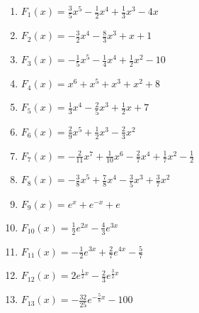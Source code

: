 \documentclass[a4paper,12pt, headsepline, ngerman]{scrartcl}
\theoremstyle{definition}
\begin{document}
\begin{Answer}[ref=stammfunktionenA1]
	\begin{enumerate}[label=\alph*)]
		\item \(F_1(x)=\frac{3}{5}x^5-\frac{1}{2}x^4+\frac{1}{3}x^3-4x\)
		\item \(F_2(x)=-\frac{3}{2}x^4-\frac{8}{3}x^3+x+1\)
		\item \(F_3(x)=-\frac{1}{5}x^5-\frac{1}{4}x^4+\frac{1}{2}x^2-10\)
		\item \(F_4(x)=x^6+x^5+x^3+x^2+8\)
		\item \(F_5(x)=\frac{1}{3}x^4-\frac{2}{5}x^3+\frac{1}{2}x+7\)
		\item \(F_6(x)=\frac{2}{9}x^5+\frac{1}{2}x^3-\frac{2}{3}x^2\)
		\item \(F_7(x)=-\frac{2}{11}x^7+\frac{1}{10}x^6-\frac{2}{7}x^4+\frac{1}{7}x^2-\frac{1}{2}\)
		\item \(F_8(x)=-\frac{3}{8}x^5+\frac{7}{8}x^4-\frac{3}{5}x^3+\frac{3}{7}x^2\)
		\item \(F_9(x)=e^x+e^{-x}+e\)
		\item \(F_{10}(x)=\frac{1}{2}e^{2x}-\frac{4}{3}e^{3x}\)
		\item \(F_{11}(x)=-\frac{1}{2}e^{3x}+\frac{2}{7}e^{4x}-\frac{5}{7}\)
		\item \(F_{12}(x)=2e^{\frac{1}{2}x}-\frac{2}{3}e^{\frac{3}{2}x}\)
		\item \(F_{13}(x)=-\frac{32}{25}e^{-\frac{5}{8}x}-100\)
	\end{enumerate}
\end{Answer}
\end{document}
